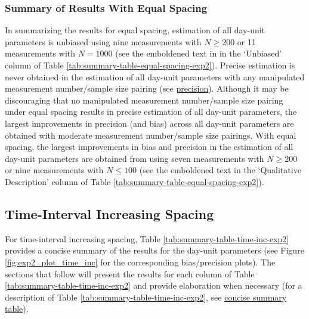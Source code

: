\documentclass[
12pt, %
twoside,
english]{guelphthesis}
\begin{document}
\hypertarget{summary-of-results-with-equal-spacing-1}{%
\subsubsection{Summary of Results With Equal Spacing}\label{summary-of-results-with-equal-spacing-1}}

In summarizing the results for equal spacing, estimation of all day-unit parameters is unbiased using nine measurements with \(N \ge 200\) or 11 measurements with \(N = 1000\) (see the emboldened text in in the `Unbiased' column of Table \ref{tab:summary-table-equal-spacing-exp2}). Precise estimation is never obtained in the estimation of all day-unit parameters with any manipulated measurement number/sample size pairing (see \protect\hyperlink{precision-time-inc-exp2}{precision}). Although it may be discouraging that no manipulated measurement number/sample size pairing under equal spacing results in precise estimation of all day-unit parameters, the largest improvements in precision (and bias) across all day-unit parameters are obtained with moderate measurement number/sample size pairings. With equal spacing, the largest improvements in bias and precision in the estimation of all day-unit parameters are obtained from using seven measurements with \(N \ge 200\) or nine measurements with \(N \le 100\) (see the emboldened text in the `Qualitative Description' column of Table \ref{tab:summary-table-equal-spacing-exp2}).

\hypertarget{time-interval-increasing-spacing-1}{%
\subsection{Time-Interval Increasing Spacing}\label{time-interval-increasing-spacing-1}}

For time-interval increasing spacing, Table \ref{tab:summary-table-time-inc-exp2} provides a concise summary of the results for the day-unit parameters (see Figure \ref{fig:exp2_plot_time_inc} for the corresponding bias/precision plots). The sections that follow will present the results for each column of Table \ref{tab:summary-table-time-inc-exp2} and provide elaboration when necessary (for a description of Table \ref{tab:summary-table-time-inc-exp2}, see \protect\hyperlink{concise-example}{concise summary table}).
\end{document}
